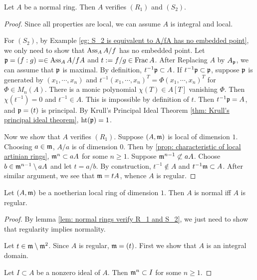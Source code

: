     \begin{lemma}\label{lem: normal rings verify R_1 and S_2}
        Let $A$ be a normal ring.
        Then $A$ verifies $(R_1)$ and $(S_2)$.
    \end{lemma}
    \begin{proof}
        Since all properties are local, we can assume $A$ is integral and local.

        For $(S_2)$, by Example \ref{eg: S_2 is equivalent to A/fA has no embedded point}, we only need to show that $\operatorname{Ass}_A A/f$ has no embedded point.
        Let ${\mathfrak{p}} = (f:g) = \in \operatorname{Ass}_A A/fA$ and $t:= f/g \in \operatorname{Frac} A$.
        After Replacing $A$ by $A_{\mathfrak{p}}$, we can assume that ${\mathfrak{p}}$ is maximal.
        By definition, $t^{-1}{\mathfrak{p}} \subset A$.
        If $t^{-1}{\mathfrak{p}} \subset {\mathfrak{p}}$, suppose ${\mathfrak{p}}$ is generated by $(x_1,\cdots,x_n)$ and $t^{-1}(x_1,\cdots,x_n)^T = \Phi(x_1,\cdots,x_n)^T$ for $\Phi \in M_n(A)$.
        There is a monic polynomial $\chi(T) \in A[T]$ vanishing $\Phi$.
        Then $\chi(t^{-1}) = 0$ and $t^{-1} \in A$.
        This is impossible by definition of $t$.
        Then $t^{-1}{\mathfrak{p}} = A$, and ${\mathfrak{p}} = (t)$ is principal. 
        By Krull's Principal Ideal Theorem \ref{thm: Krull's principal ideal theorem}, $\operatorname{ht}({\mathfrak{p}}) = 1$.

        Now we show that $A$ verifies $(R_1)$.
        Suppose $(A, {\mathfrak{m}})$ is local of dimension $1$.
        Choosing $a \in {\mathfrak{m}}$, $A/a$ is of dimension $0$.
        Then by \ref{prop: characteristic of local artinian rings}, ${\mathfrak{m}}^n \subset aA$ for some $n\geq 1$.
        Suppose ${\mathfrak{m}}^{n-1} \not\subset aA$.
        Choose $b \in {\mathfrak{m}}^{n-1} \setminus aA$ and let $t = a/b$.
        By construction, $t^{-1} \notin A$ and $t^{-1}{\mathfrak{m}} \subset A$.
        After similar argument, we see that ${\mathfrak{m}} = tA$, whence $A$ is regular.
    \end{proof}

    \begin{lemma}\label{lem: normal and regular are equivalent for noetherian rings of dimension 1}
        Let $(A,{\mathfrak{m}})$ be a noetherian local ring of dimension $1$.
        Then $A$ is normal iff $A$ is regular.
    \end{lemma}
    \begin{proof}
        By lemma \ref{lem: normal rings verify R_1 and S_2}, we just need to show that regularity implies normality.

        Let $t \in {\mathfrak{m}}\setminus {\mathfrak{m}}^2$.
        Since $A$ is regular, ${\mathfrak{m}} = (t)$.
        First we show that $A$ is an integral domain.

        Let $I \subset A$ be a nonzero ideal of $A$.
        Then ${\mathfrak{m}}^n \subset I$ for some $n \geq 1$.
    \end{proof}

